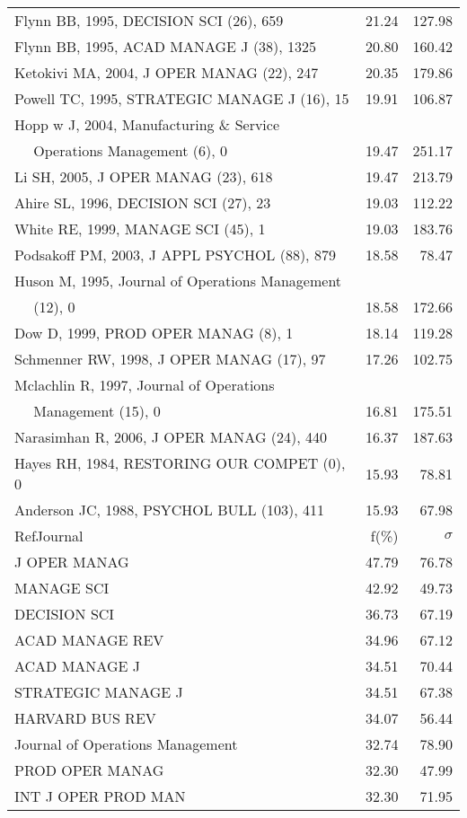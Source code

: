 \documentclass[a4paper,11pt]{report}
\begin{document}
\begin{landscape}
\begin{table}[!ht]
{\begin{tabular}{|l r r|}
Flynn BB, 1995, DECISION SCI (26), 659 & 21.24 & 127.98\\
Flynn BB, 1995, ACAD MANAGE J (38), 1325 & 20.80 & 160.42\\
Ketokivi MA, 2004, J OPER MANAG (22), 247 & 20.35 & 179.86\\
Powell TC, 1995, STRATEGIC MANAGE J (16), 15 & 19.91 & 106.87\\
Hopp w J, 2004, Manufacturing \& Service &  & \\
$\quad$ Operations Management (6), 0 & 19.47 & 251.17\\
Li SH, 2005, J OPER MANAG (23), 618 & 19.47 & 213.79\\
Ahire SL, 1996, DECISION SCI (27), 23 & 19.03 & 112.22\\
White RE, 1999, MANAGE SCI (45), 1 & 19.03 & 183.76\\
Podsakoff PM, 2003, J APPL PSYCHOL (88), 879 & 18.58 & 78.47\\
Huson M, 1995, Journal of Operations Management &  & \\
$\quad$ (12), 0 & 18.58 & 172.66\\
Dow D, 1999, PROD OPER MANAG (8), 1 & 18.14 & 119.28\\
Schmenner RW, 1998, J OPER MANAG (17), 97 & 17.26 & 102.75\\
Mclachlin R, 1997, Journal of Operations &  & \\
$\quad$ Management (15), 0 & 16.81 & 175.51\\
Narasimhan R, 2006, J OPER MANAG (24), 440 & 16.37 & 187.63\\
Hayes RH, 1984, RESTORING OUR COMPET (0), 0 & 15.93 & 78.81\\
Anderson JC, 1988, PSYCHOL BULL (103), 411 & 15.93 & 67.98\\
\hline
\hline
RefJournal & f(\%) & $\sigma$\\
\hline
J OPER MANAG & 47.79 & 76.78\\
MANAGE SCI & 42.92 & 49.73\\
DECISION SCI & 36.73 & 67.19\\
ACAD MANAGE REV & 34.96 & 67.12\\
ACAD MANAGE J & 34.51 & 70.44\\
STRATEGIC MANAGE J & 34.51 & 67.38\\
HARVARD BUS REV & 34.07 & 56.44\\
Journal of Operations Management & 32.74 & 78.90\\
PROD OPER MANAG & 32.30 & 47.99\\
INT J OPER PROD MAN & 32.30 & 71.95\\
\hline
\end{tabular}
}
\end{table}


\end{landscape}
\end{document}
